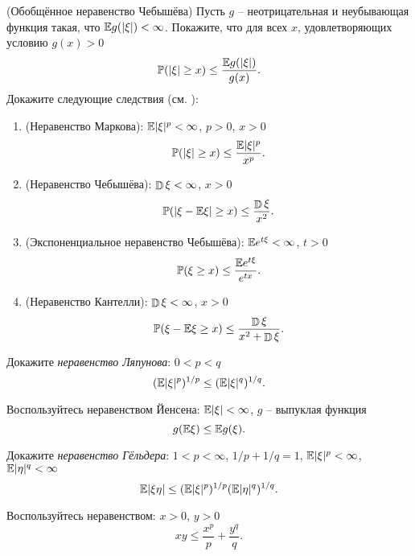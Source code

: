 

\begin{problem}(Обобщённое неравенство Чебышёва)
Пусть $g$ -- неотрицательная и неубывающая функция такая, что $\mathrm{{\mathbb E}} g(|\xi|) < \infty$. Покажите, что для всех $x$, удовлетворяющих условию $g(x) > 0$
\[
\mathrm{{\mathbb P}}(|\xi| \geq x) \leq \frac{ \mathrm{{\mathbb E}} g(|\xi|) }{ g(x)}.
\]
Докажите следующие следствия (см. \cite{21}):
\begin{enumerate}
\item (Неравенство Маркова): $\mathrm{{\mathbb E}} |\xi|^p < \infty$, $p > 0$, $x > 0$
\[
\mathrm{{\mathbb P}}(|\xi| \geq x) \leq \frac{ \mathrm{{\mathbb E}} |\xi|^p }{ x^p}.
\]
\item (Неравенство Чебышёва): $\mathop{\mathbb{D}}\nolimits \xi < \infty$, $x > 0$
\[
\mathrm{{\mathbb P}}(|\xi - \mathrm{{\mathbb E}} \xi| \geq x) \leq \frac{ \mathop{\mathbb{D}}\nolimits \xi }{ x^2}.
\]
\item (Экспоненциальное неравенство Чебышёва): $\mathrm{{\mathbb E}} e^{t \xi} < \infty$, $t > 0$
\[
\mathrm{{\mathbb P}}(\xi \geq x) \leq \frac{ \mathrm{{\mathbb E}} e^{t \xi} }{ e^{t x} }.
\]
\item (Неравенство Кантелли): $\mathop{\mathbb{D}}\nolimits \xi < \infty$, $x > 0$
\[
\mathrm{{\mathbb P}}( \xi - \mathrm{{\mathbb E}} \xi \geq x) \leq \frac{ \mathop{\mathbb{D}}\nolimits \xi }{ x^2 + \mathop{\mathbb{D}}\nolimits \xi}.
\]
\end{enumerate}

\end{problem}

\begin{problem}
Докажите \textit{неравенство Ляпунова}: $0 < p < q$ 
\[
(\mathrm{{\mathbb E}} |\xi|^p)^{1/p} \leq (\mathrm{{\mathbb E}} |\xi|^q)^{1/q}. 
\]
\end{problem}

\begin{ordre}
Воспользуйтесь неравенством Йенсена: $\mathrm{{\mathbb E}} |\xi| < \infty$, $g$ -- выпуклая функция
\[
g(\mathrm{{\mathbb E}} \xi) \leq \mathrm{{\mathbb E}} g(\xi). 
\]

\end{ordre}

\begin{problem}
Докажите \textit{неравенство Гёльдера}: $1 < p < \infty$, $1/p + 1/q = 1$, $\mathrm{{\mathbb E}} |\xi|^p < \infty$, $\mathrm{{\mathbb E}} |\eta|^q < \infty$  
\[
\mathrm{{\mathbb E}} |\xi \eta | \leq (\mathrm{{\mathbb E}} |\xi|^p)^{1/p} (\mathrm{{\mathbb E}} |\eta|^q)^{1/q}. 
\]
\end{problem}

\begin{ordre}
Воспользуйтесь неравенством: $x > 0$, $y > 0$ 
\[
x y \leq \frac{x^p}{p} + \frac{y^q}{q}.  
\]

\end{ordre}

